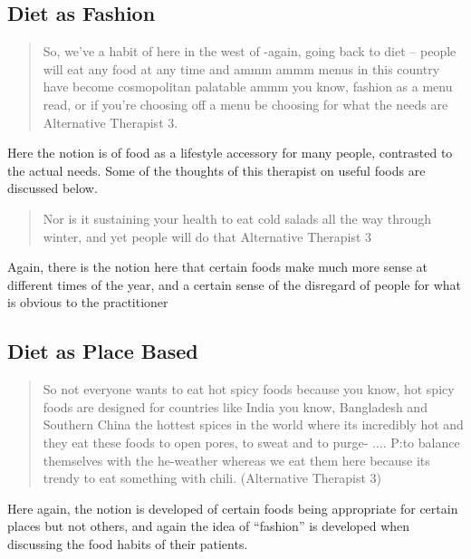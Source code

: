 \subsection{Diet as Fashion}
\label{sec:diet-as-fashion}

\begin{quotation}
  So, we've a habit of here in the west of -again, going back to diet – people will eat any food at any time and ammm ammm menus in this country have become cosmopolitan palatable ammm you know, fashion as a menu read, or if you're choosing off  a menu be choosing for what the needs are
Alternative Therapist 3. 
\end{quotation}

Here the notion is of food as a lifestyle accessory for many people, contrasted to the actual needs. Some of the thoughts of this therapist on useful foods are discussed below. 

\begin{quotation}
  Nor is it sustaining your health to eat cold salads all the way through winter, and yet people will do that
Alternative Therapist 3
\end{quotation}

Again, there is the notion here that certain foods make much more sense at different times of the year, and a certain sense of the disregard of people for what is obvious to the practitioner 



\subsection{Diet as Place Based}
\label{sec:diet-as-place}

\begin{quotation}
  So not everyone wants to eat hot spicy foods because you know, hot spicy foods are designed for countries like India you know, Bangladesh and Southern China the hottest spices in the world where its incredibly hot and they eat these foods to open pores, to sweat and to purge-
....
P:to balance themselves with the he-weather whereas we eat them here because its trendy to eat something with chili.
(Alternative Therapist 3)
\end{quotation}

Here again, the notion is developed of certain foods being appropriate for certain places but not others, and again the idea of ``fashion'' is developed when discussing the food habits of their patients. 

